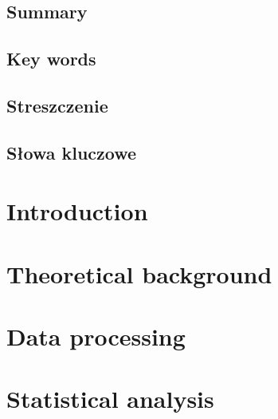 \documentclass[12pt]{report}
\begin{document}
    
    \pagestyle{empty}
    \section*{Summary}
    \section*{Key words}
    \newpage
    \pagestyle{empty}
    \section*{Streszczenie}
    \section*{Słowa kluczowe}
    
    
    \tableofcontents
    
    
    \pagestyle{fancy}
    \chapter{Introduction} \label{ch:introduction} %
    
    \chapter{Theoretical background}
    
    \chapter{Data processing}
    
    \chapter{Statistical analysis}
    


\end{document}
